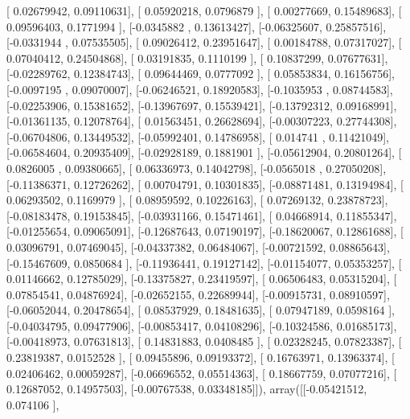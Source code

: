 \documentclass{article}
\begin{document}
       [ 0.02679942,  0.09110631],
       [ 0.05920218,  0.0796879 ],
       [ 0.00277669,  0.15489683],
       [ 0.09596403,  0.1771994 ],
       [-0.0345882 ,  0.13613427],
       [-0.06325607,  0.25857516],
       [-0.0331944 ,  0.07535505],
       [ 0.09026412,  0.23951647],
       [ 0.00184788,  0.07317027],
       [ 0.07040412,  0.24504868],
       [ 0.03191835,  0.1110199 ],
       [ 0.10837299,  0.07677631],
       [-0.02289762,  0.12384743],
       [ 0.09644469,  0.0777092 ],
       [ 0.05853834,  0.16156756],
       [-0.0097195 ,  0.09070007],
       [-0.06246521,  0.18920583],
       [-0.1035953 ,  0.08744583],
       [-0.02253906,  0.15381652],
       [-0.13967697,  0.15539421],
       [-0.13792312,  0.09168991],
       [-0.01361135,  0.12078764],
       [ 0.01563451,  0.26628694],
       [-0.00307223,  0.27744308],
       [-0.06704806,  0.13449532],
       [-0.05992401,  0.14786958],
       [ 0.014741  ,  0.11421049],
       [-0.06584604,  0.20935409],
       [-0.02928189,  0.1881901 ],
       [-0.05612904,  0.20801264],
       [ 0.0826005 ,  0.09380665],
       [ 0.06336973,  0.14042798],
       [-0.0565018 ,  0.27050208],
       [-0.11386371,  0.12726262],
       [ 0.00704791,  0.10301835],
       [-0.08871481,  0.13194984],
       [ 0.06293502,  0.1169979 ],
       [ 0.08959592,  0.10226163],
       [ 0.07269132,  0.23878723],
       [-0.08183478,  0.19153845],
       [-0.03931166,  0.15471461],
       [ 0.04668914,  0.11855347],
       [-0.01255654,  0.09065091],
       [-0.12687643,  0.07190197],
       [-0.18620067,  0.12861688],
       [ 0.03096791,  0.07469045],
       [-0.04337382,  0.06484067],
       [-0.00721592,  0.08865643],
       [-0.15467609,  0.0850684 ],
       [-0.11936441,  0.19127142],
       [-0.01154077,  0.05353257],
       [ 0.01146662,  0.12785029],
       [-0.13375827,  0.23419597],
       [ 0.06506483,  0.05315204],
       [ 0.07854541,  0.04876924],
       [-0.02652155,  0.22689944],
       [-0.00915731,  0.08910597],
       [-0.06052044,  0.20478654],
       [ 0.08537929,  0.18481635],
       [ 0.07947189,  0.0598164 ],
       [-0.04034795,  0.09477906],
       [-0.00853417,  0.04108296],
       [-0.10324586,  0.01685173],
       [-0.00418973,  0.07631813],
       [ 0.14831883,  0.0408485 ],
       [ 0.02328245,  0.07823387],
       [ 0.23819387,  0.0152528 ],
       [ 0.09455896,  0.09193372],
       [ 0.16763971,  0.13963374],
       [ 0.02406462,  0.00059287],
       [-0.06696552,  0.05514363],
       [ 0.18667759,  0.07077216],
       [ 0.12687052,  0.14957503],
       [-0.00767538,  0.03348185]]), array([[-0.05421512,  0.074106  ],
\end{document}

